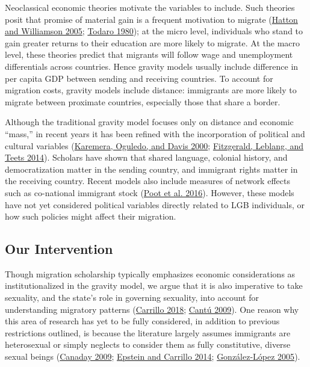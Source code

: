 \documentclass[
  11pt,
]{article}
\begin{document}
Neoclassical economic theories motivate the variables to include. Such theories posit that promise of material gain is a frequent motivation to migrate (\protect\hyperlink{ref-hatton_2005a}{Hatton and Williamson 2005}; \protect\hyperlink{ref-todaro_1980}{Todaro 1980}); at the micro level, individuals who stand to gain greater returns to their education are more likely to migrate. At the macro level, these theories predict that migrants will follow wage and unemployment differentials across countries. Hence gravity models usually include difference in per capita GDP between sending and receiving countries. To account for migration costs, gravity models include distance: immigrants are more likely to migrate between proximate countries, especially those that share a border.

Although the traditional gravity model focuses only on distance and economic ``mass,'' in recent years it has been refined with the incorporation of political and cultural variables (\protect\hyperlink{ref-karemera_2000}{Karemera, Oguledo, and Davis 2000}; \protect\hyperlink{ref-fitzgerald_2014}{Fitzgerald, Leblang, and Teets 2014}). Scholars have shown that shared language, colonial history, and democratization matter in the sending country, and immigrant rights matter in the receiving country. Recent models also include measures of network effects such as co-national immigrant stock (\protect\hyperlink{ref-poot_2016}{Poot et al. 2016}). However, these models have not yet considered political variables directly related to LGB individuals, or how such policies might affect their migration.

\hypertarget{our-intervention}{%
\subsection{Our Intervention}\label{our-intervention}}

Though migration scholarship typically emphasizes economic considerations as institutionalized in the gravity model, we argue that it is also imperative to take sexuality, and the state's role in governing sexuality, into account for understanding migratory patterns (\protect\hyperlink{ref-carrillo_2018}{Carrillo 2018}; \protect\hyperlink{ref-cantu_2009}{Cantú 2009}). One reason why this area of research has yet to be fully considered, in addition to previous restrictions outlined, is because the literature largely assumes immigrants are heterosexual or simply neglects to consider them as fully constitutive, diverse sexual beings (\protect\hyperlink{ref-canaday_2009}{Canaday 2009}; \protect\hyperlink{ref-epstein_2014}{Epstein and Carrillo 2014}; \protect\hyperlink{ref-gonzalez-lopez_2005}{González-López 2005}).
\end{document}
